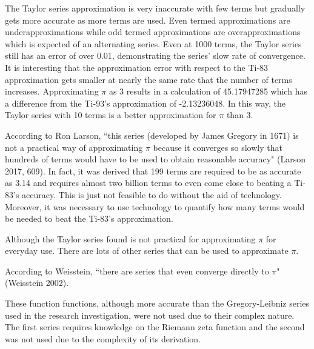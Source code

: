 The Taylor series approximation is very inaccurate with few terms but gradually gets more accurate as more terms are used. Even termed approximations are underapproximations while odd termed approximations are overapproximations which is expected of an alternating series. Even at 1000 terms, the Taylor series still has an error of over 0.01, demonstrating the series' slow rate of convergence. It is interesting that the approximation error with respect to the Ti-83 approximation gets smaller at nearly the same rate that the number of terms increases. Approximating \(\pi\) as 3 results in a calculation of 45.17947285 which has a difference from the Ti-93's approximation of -2.13236048. In this way, the Taylor series with 10 terms is a better approximation for \(\pi\) than 3. 

According to Ron Larson, ``this series (developed by James Gregory in 1671) is not a practical way of approximating \(\pi\) because it converges so slowly that hundreds of terms would have to be used to obtain reasonable accuracy" (Larson 2017, 609). In fact, it was derived that 199 terms are required to be as accurate as 3.14 and requires almost two billion terms to even come close to beating a Ti-83's accuracy. This is just not feasible to do without the aid of technology. Moreover, it was necessary to use technology to quantify how many terms would be needed to beat the Ti-83's approximation.

Although the Taylor series found is not practical for approximating \(\pi\) for everyday use. There are lots of other series that can be used to approximate \(\pi\). 

According to Weisstein, ``there are series that even converge directly to \(\pi\)" (Weisstein 2002).


These function functions, although more accurate than the Gregory-Leibniz series used in the research investigation, were not used due to their complex nature. The first series requires knowledge on the Riemann zeta function and the second was not used due to the complexity of its derivation.







